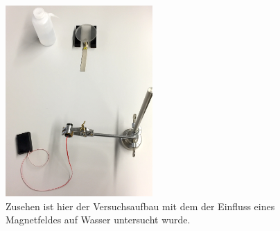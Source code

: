 \begin{figure}[h]
	\includegraphics[width=0.5\textwidth]{res/Wasser.jpg}
	\caption{Zusehen ist hier der Versuchsaufbau mit dem der Einfluss eines Magnetfeldes auf Wasser untersucht wurde\protect\footnotemark.}
	\label{fig:Aufbau}
\end{figure}
